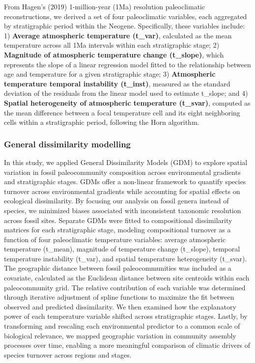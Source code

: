 \documentclass[
]{agujournal2019}
\begin{document}
From Hagen's (2019) 1-million-year (1Ma) resolution paleoclimatic
reconstructions, we derived a set of four paleoclimatic variables, each
aggregated by stratigraphic period within the Neogene. Specifically,
these variables include: 1) \textbf{Average atmospheric temperature
(t\_var)}, calculated as the mean temperature across all 1Ma intervals
within each stratigraphic stage; 2) \textbf{Magnitude of atmospheric
temperature change (t\_slope)}, which represents the slope of a linear
regression model fitted to the relationship between age and temperature
for a given stratigraphic stage; 3) \textbf{Atmospheric temperature
temporal instability (t\_inst)}, measured as the standard deviation of
the residuals from the linear model used to estimate t\_slope; and 4)
\textbf{Spatial heterogeneity of atmospheric temperature (t\_svar)},
computed as the mean difference between a focal temperature cell and its
eight neighboring cells within a stratigraphic period, following the
Horn algorithm.

\subsubsection{General dissimilarity
modelling}\label{general-dissimilarity-modelling}

In this study, we applied General Dissimilarity Models (GDM) to explore
spatial variation in fossil paleocommunity composition across
environmental gradients and stratigraphic stages. GDMs offer a
non-linear framework to quantify species turnover across environmental
gradients while accounting for spatial effects on ecological
dissimilarity. By focusing our analysis on fossil genera instead of
species, we minimized biases associated with inconsistent taxonomic
resolution across fossil sites. Separate GDMs were fitted to
compositional dissimilarity matrices for each stratigraphic stage,
modeling compositional turnover as a function of four paleoclimatic
temperature variables: average atmospheric temperature (t\_mean),
magnitude of temperature change (t\_slope), temporal temperature
instability (t\_var), and spatial temperature heterogeneity (t\_svar).
The geographic distance between fossil paleocommunities was included as
a covariate, calculated as the Euclidean distance between site centroids
within each paleocommunity grid. The relative contribution of each
variable was determined through iterative adjustment of spline functions
to maximize the fit between observed and predicted dissimilarity. We
then examined how the explanatory power of each temperature variable
shifted across stratigraphic stages. Lastly, by transforming and
rescaling each environmental predictor to a common scale of biological
relevance, we mapped geographic variation in community assembly
processes over time, enabling a more meaningful comparison of climatic
drivers of species turnover across regions and stages.
\end{document}
